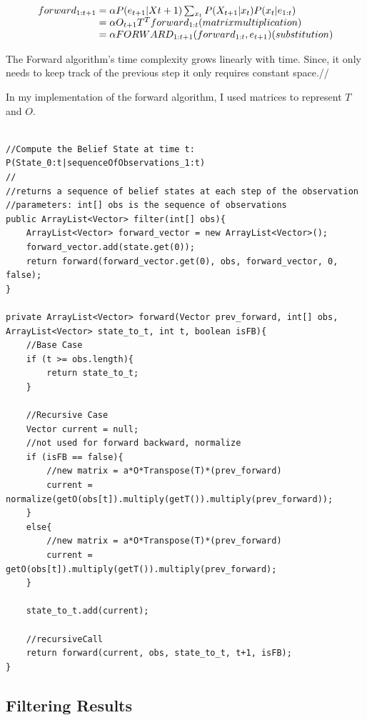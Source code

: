 \documentclass[a4paper]{article}
\begin{document}
\begin{equation}
\begin{array}{l@{}l}
forward_{1:t+1}
&{}= \alpha P(e_{t+1}|X{t+1}) \sum_{\substack{x_t}} P(X_{t+1}|x_t)P(x_t|e_{1:t})\\
&{}= \alpha O_{t+1} T^T forward_{1:t}(matrix multiplication)\\
&{}= \alpha FORWARD_{1:t+1}(forward_{1:t}, e_{t+1})(substitution)\\
\end{array}
\end{equation}

The Forward algorithm's time complexity grows linearly with time. Since, it only needs to keep track of the previous step it only requires constant space.//

In my implementation of the forward algorithm, I used matrices to represent $T$ and $O$. 

\begin{lstlisting}

//Compute the Belief State at time t: P(State_0:t|sequenceOfObservations_1:t)
//
//returns a sequence of belief states at each step of the observation
//parameters: int[] obs is the sequence of observations
public ArrayList<Vector> filter(int[] obs){
	ArrayList<Vector> forward_vector = new ArrayList<Vector>();
	forward_vector.add(state.get(0));
	return forward(forward_vector.get(0), obs, forward_vector, 0, false);
}

private ArrayList<Vector> forward(Vector prev_forward, int[] obs,  ArrayList<Vector> state_to_t, int t, boolean isFB){
	//Base Case
	if (t >= obs.length){
		return state_to_t;
	}

	//Recursive Case		
	Vector current = null;
	//not used for forward backward, normalize
	if (isFB == false){
		//new matrix = a*O*Transpose(T)*(prev_forward)
		current = normalize(getO(obs[t]).multiply(getT()).multiply(prev_forward));
	}
	else{
		//new matrix = a*O*Transpose(T)*(prev_forward)
		current = getO(obs[t]).multiply(getT()).multiply(prev_forward);
	}
	
	state_to_t.add(current);
	
	//recursiveCall
	return forward(current, obs, state_to_t, t+1, isFB);
}
\end{lstlisting}

\subsection{Filtering Results}
\end{document}
